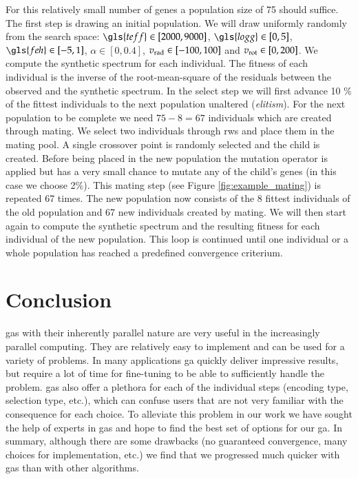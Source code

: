 For this relatively small number of genes a population size of 75 should suffice. The first step is drawing an initial population. We will draw uniformly randomly from the search space: $\gls{teff} \in [2000, 9000]$, $\gls{logg} \in [0, 5]$, $\gls{feh} \in [-5,1]$, $\alpha \in [0,0.4]$, $\hbox{\ensuremath{v_{\textrm{rad}}}} \in [-100, 100]$ and $v_{\textrm{rot}} \in [0,200]$. We compute the synthetic spectrum for each individual. The fitness of each individual is the inverse of the root-mean-square of the residuals between the observed and the synthetic spectrum. 
In the select step we will first advance 10 \% of the fittest individuals to the next population unaltered (\textit{elitism}). For the next population to be complete we need $75 - 8 = 67$ individuals which are created through mating. We select two individuals through \gls{rws} and place them in the mating pool. A single crossover point is randomly selected and the child is created. Before being placed in the new population the mutation operator is applied but has a very small chance to mutate any of the child's genes (in this case we choose 2\%).
This mating step (see Figure \ref{fig:example_mating}) is repeated 67 times. The new population now consists of the 8 fittest individuals of the old population and 67 new individuals created by mating. We will then start again to compute the synthetic spectrum and the resulting fitness for each individual of the new population. This loop is continued until one individual or a whole population has reached a predefined convergence criterium.

\section{Conclusion}

\glspl{ga} with their inherently parallel nature are very useful in the increasingly parallel computing. They are relatively easy to implement and can be used for a variety of problems. In many applications \gls{ga} quickly deliver impressive results, but require a lot of time for fine-tuning to be able to sufficiently handle the problem. \glspl{ga} also offer a plethora for each of the individual steps (encoding type, selection type, etc.), which can confuse users that are not very familiar with the consequence for each choice. To alleviate this problem in our work we have sought the help of experts in \glspl{ga} and hope to find the best set of options for our \gls{ga}. 
In summary, although there are some drawbacks (no guaranteed convergence, many choices for implementation, etc.) we find that we progressed much quicker with \glspl{ga} than with other algorithms. 


